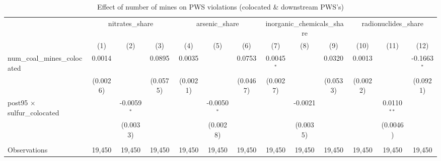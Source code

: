 
\begin{table}[htbp]
   \caption{\label{olsrf2sls_nummine_mine_vio_1985to2005_colocateddownstream} Effect of number of mines on PWS violations (colocated \& downstream PWS's)}
   \bigskip
   \centering
   \begin{adjustbox}{width = \textwidth, center}
      \begin{tabular}{lcccccccccccc}
         \toprule
          & \multicolumn{3}{c}{nitrates\_share} & \multicolumn{3}{c}{arsenic\_share} & \multicolumn{3}{c}{inorganic\_chemicals\_share} & \multicolumn{3}{c}{radionuclides\_share}\\
                                                            & (1)                   & (2)           & (3)           & (4)           & (5)           & (6)           & (7)           & (8)                   & (9)                   & (10)                  & (11)          & (12)\\  
         \midrule 
         num\_coal\_mines\_colocated                        & 0.0014                &               & 0.0895        & 0.0035        &               & 0.0753        & 0.0045$^{*}$  &                       & 0.0320                & 0.0013                &               & -0.1663$^{*}$\\   
                                                            & (0.0026)              &               & (0.0575)      & (0.0021)      &               & (0.0467)      & (0.0027)      &                       & (0.0533)              & (0.0022)              &               & (0.0921)\\   
         post95 $\times$ sulfur\_colocated                  &                       & -0.0059$^{*}$ &               &               & -0.0050$^{*}$ &               &               & -0.0021               &                       &                       & 0.0110$^{**}$ &   \\   
                                                            &                       & (0.0033)      &               &               & (0.0028)      &               &               & (0.0035)              &                       &                       & (0.0046)      &   \\   
          \\
         Observations                                       & 19,450                & 19,450        & 19,450        & 19,450        & 19,450        & 19,450        & 19,450        & 19,450                & 19,450                & 19,450                & 19,450        & 19,450\\  

\end{tabular}
\end{adjustbox}
\end{table}
